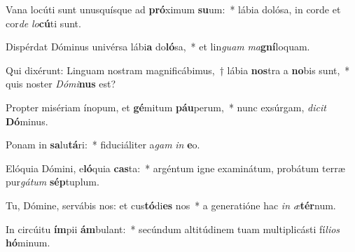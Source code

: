 \item Vana locúti sunt unusquísque ad \textbf{pró}ximum \textbf{su}um:~* lábia dolósa, in corde et cor\textit{de} \textit{lo}\textbf{cú}ti sunt.
\item Dispérdat Dóminus univérsa lábi\textbf{a} do\textbf{ló}sa,~* et lin\textit{guam} \textit{ma}\textbf{gní}loquam.
\item Qui dixérunt: Linguam nostram magnificábimus,~† lábia \textbf{nos}tra a \textbf{no}bis sunt,~* quis noster \textit{Dó}\textit{mi}\textbf{nus} est?
\item Propter misériam ínopum, et \textbf{gé}mitum \textbf{páu}perum,~* nunc exsúrgam, \textit{di}\textit{cit} \textbf{Dó}minus.
\item Ponam in \textbf{sa}lu\textbf{tá}ri:~* fiduciáliter a\textit{gam} \textit{in} \textbf{e}o.
\item Elóquia Dómini, e\textbf{ló}quia \textbf{cas}ta:~* argéntum igne examinátum, probátum terræ pur\textit{gá}\textit{tum} \textbf{sép}tuplum.
\item Tu, Dómine, servábis nos: et cus\textbf{tó}di\textbf{es} nos~* a generatióne hac \textit{in} \textit{æ}\textbf{tér}num.
\item In circúitu \textbf{ím}pii \textbf{ám}bulant:~* secúndum altitúdinem tuam multiplicásti fí\textit{li}\textit{os} \textbf{hó}minum.

